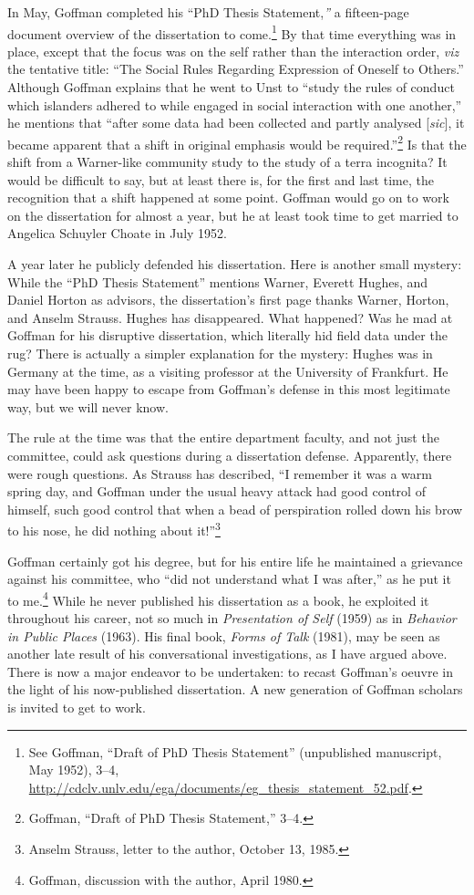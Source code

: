\documentclass[twoside,symmetric,nobib,justified]{tufte-book}
\begin{document}
In May, Goffman completed his ``PhD Thesis Statement,\emph{''} a
fifteen-page document overview of the dissertation to come.\footnote{See
  Goffman, ``Draft of PhD Thesis Statement'' (unpublished manuscript,
  May 1952), 3--4,
  \url{http://cdclv.unlv.edu/ega/documents/eg_thesis_statement_52.pdf}.}
By that time everything was in place, except that the focus was on the
self rather than the interaction order, \emph{viz} the tentative title:
``The Social Rules Regarding Expression of Oneself to Others.'' Although
Goffman explains that he went to Unst to ``study the rules of conduct
which islanders adhered to while engaged in social interaction with one
another,'' he mentions that ``after some data had been collected and
partly analysed {[}\emph{sic}{]}, it became apparent that a shift in
original emphasis would be required.''\footnote{Goffman, ``Draft of PhD
  Thesis Statement,'' 3--4.} Is that the shift from a Warner-like
community study to the study of a terra incognita? It would be difficult
to say, but at least there is, for the first and last time, the
recognition that a shift happened at some point. Goffman would go on to
work on the dissertation for almost a year, but he at least took time to
get married to Angelica Schuyler Choate in July 1952.

A year later he publicly defended his dissertation. Here is another
small mystery: While the ``PhD Thesis Statement'' mentions Warner,
Everett Hughes, and Daniel Horton as advisors, the dissertation's first
page thanks Warner, Horton, and Anselm Strauss. Hughes has disappeared.
What happened? Was he mad at Goffman for his disruptive dissertation,
which literally hid field data under the rug? There is actually a
simpler explanation for the mystery: Hughes was in Germany at the time,
as a visiting professor at the University of Frankfurt. He may have been
happy to escape from Goffman's defense in this most legitimate way, but
we will never know.

The rule at the time was that the entire department faculty, and not
just the committee, could ask questions during a dissertation defense.
Apparently, there were rough questions. As Strauss has described, ``I
remember it was a warm spring day, and Goffman under the usual heavy
attack had good control of himself, such good control that when a bead
of perspiration rolled down his brow to his nose, he did nothing about
it!''\footnote{Anselm Strauss, letter to the author, October 13, 1985.}

Goffman certainly got his degree, but for his entire life he maintained
a grievance against his committee, who ``did not understand what I was
after,'' as he put it to me.\footnote{Goffman, discussion with the
  author, April 1980.} While he never published his dissertation as a
book, he exploited it throughout his career, not so much in
\emph{Presentation of Self} (1959) as in \emph{Behavior in Public
Places} (1963). His final book, \emph{Forms of Talk} (1981), may be seen
as another late result of his conversational investigations, as I have
argued above. There is now a major endeavor to be undertaken: to recast
Goffman's oeuvre in the light of his now-published dissertation. A new
generation of Goffman scholars is invited to get to work.
\end{document}
